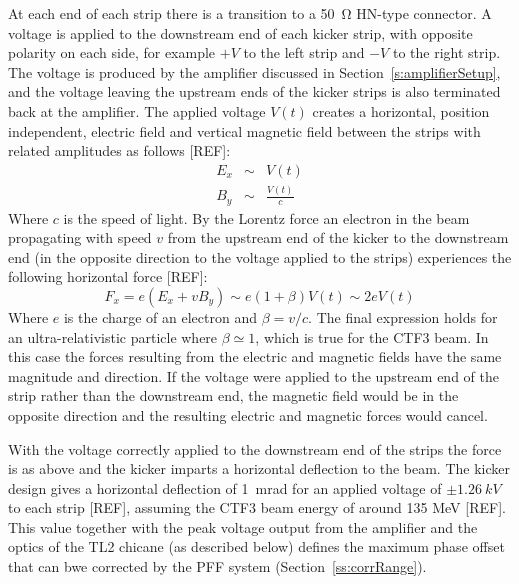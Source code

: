 At each end of each strip there is a transition to a 50~\(\mathrm{\Omega}\) HN-type connector. A voltage is applied to the downstream end of each kicker strip, with opposite polarity on each side, for example \(+V\) to the left strip and \(-V\) to the right strip. The voltage is produced by the amplifier discussed in Section~\ref{s:amplifierSetup}, and the voltage leaving the upstream ends of the kicker strips is also terminated back at the amplifier. The applied voltage \(V(t)\) creates a horizontal, position independent, electric field and vertical magnetic field between the strips with related amplitudes as follows [REF]:
\begin{eqnarray}
E_x &\sim& V(t) \\
B_y &\sim& \frac{V(t)}{c}
\end{eqnarray}
Where \(c\) is the speed of light. By the Lorentz force an electron in the beam propagating with speed \(v\) from the upstream end of the kicker to the downstream end (in the opposite direction to the voltage applied to the strips) experiences the following horizontal force [REF]:
\begin{equation}
F_x = e(E_x + vB_y) \sim e(1+\beta)V(t) \sim 2eV(t)
\end{equation}
Where \(e\) is the charge of an electron and \(\beta = v/c\). The final expression holds for an ultra-relativistic particle where \(\beta \simeq 1\), which is true for the CTF3 beam. In this case the forces resulting from the electric and magnetic fields have the same magnitude and direction. If the voltage were applied to the upstream end of the strip rather than the downstream end, the magnetic field would be in the opposite direction and the resulting electric and magnetic forces would cancel. 

With the voltage correctly applied to the downstream end of the strips the force is as above and the kicker imparts a horizontal deflection to the beam. The kicker design gives a horizontal deflection of 1~mrad for an applied voltage of \(\pm1.26~kV\) to each strip [REF], assuming the CTF3 beam energy of around 135 MeV [REF]. This value together with the peak voltage output from the amplifier and the optics of the TL2 chicane (as described below) defines the maximum phase offset that can bwe corrected by the PFF system (Section~\ref{ss:corrRange}).

